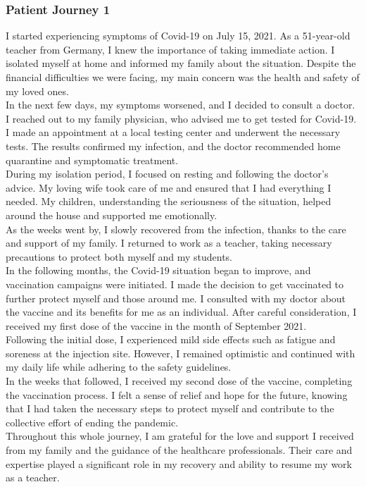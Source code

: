 \subsubsection{Patient Journey 1}\label{apx:pj1}
I started experiencing symptoms of Covid-19 on July 15, 2021. As a 51-year-old teacher from Germany, I knew the importance of taking immediate action. I isolated myself at home and informed my family about the situation. Despite the financial difficulties we were facing, my main concern was the health and safety of my loved ones.\\
In the next few days, my symptoms worsened, and I decided to consult a doctor. I reached out to my family physician, who advised me to get tested for Covid-19. I made an appointment at a local testing center and underwent the necessary tests. The results confirmed my infection, and the doctor recommended home quarantine and symptomatic treatment.\\
During my isolation period, I focused on resting and following the doctor's advice. My loving wife took care of me and ensured that I had everything I needed. My children, understanding the seriousness of the situation, helped around the house and supported me emotionally.\\
As the weeks went by, I slowly recovered from the infection, thanks to the care and support of my family. I returned to work as a teacher, taking necessary precautions to protect both myself and my students.\\
In the following months, the Covid-19 situation began to improve, and vaccination campaigns were initiated. I made the decision to get vaccinated to further protect myself and those around me. I consulted with my doctor about the vaccine and its benefits for me as an individual. After careful consideration, I received my first dose of the vaccine in the month of September 2021.\\
Following the initial dose, I experienced mild side effects such as fatigue and soreness at the injection site. However, I remained optimistic and continued with my daily life while adhering to the safety guidelines.\\
In the weeks that followed, I received my second dose of the vaccine, completing the vaccination process. I felt a sense of relief and hope for the future, knowing that I had taken the necessary steps to protect myself and contribute to the collective effort of ending the pandemic.\\
Throughout this whole journey, I am grateful for the love and support I received from my family and the guidance of the healthcare professionals. Their care and expertise played a significant role in my recovery and ability to resume my work as a teacher.
